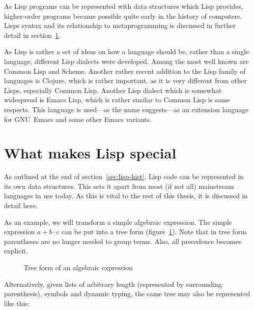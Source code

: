 \documentclass[a4paper,10pt,twoside]{report}
\newcommand{\el}{Emacs Lisp}
\newcommand{\cl}{Common Lisp}
\newcommand{\emacs}{GNU~Emacs}
\begin{document}
As Lisp programs can be represented with data structures which Lisp provides,
higher-order programs became possible quite early in the history of computers.
Lisps syntax and its relationship to metaprogramming is discussed in further
detail in section~\ref{sec:lisp-special}.

As Lisp is rather a set of ideas on how a language should be, rather than a
single language, different Lisp dialects were developed.  Among the most well
known are \cl{} and Scheme.  Another rather recent addition to the Lisp family
of languages is Clojure, which is rather important, as it is very different from
other Lisps, especially \cl{}.  Another Lisp dialect which is somewhat
widespread is \el{}, which is rather similar to \cl{} is some respects.  This
language is used---as the name suggests---as an extension language for \emacs{}
and some other Emacs variants.

\section{What makes Lisp special}
\label{sec:lisp-special}

As outlined at the end of section~\ref{sec:lisp-hist}, Lisp code can be
represented in its own data structures.  This sets it apart from most (if not
all) mainstream languages in use today. As this is vital to the rest of this
thesis, it is discussed in detail here.

As an example, we will transform a simple algebraic expression.  The simple
expression \(a + b \cdot c\) can be put into a tree form
(figure~\ref{fig:simple-tree}).  Note that in tree form parentheses are no
longer needed to group terms.  Also, all precedence becomes explicit.

\begin{figure}[h]
  \centering
  
  \caption{Tree form of an algebraic expression}
  \label{fig:simple-tree}
\end{figure}

Alternatively, given lists of arbitrary length (represented by surrounding
parenthesis), symbols and dynamic typing, the same tree may also be represented
like this:
\end{document}
